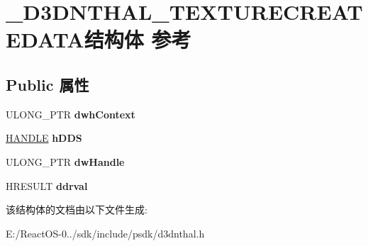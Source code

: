 \hypertarget{struct___d3_d_n_t_h_a_l___t_e_x_t_u_r_e_c_r_e_a_t_e_d_a_t_a}{}\section{\+\_\+\+D3\+D\+N\+T\+H\+A\+L\+\_\+\+T\+E\+X\+T\+U\+R\+E\+C\+R\+E\+A\+T\+E\+D\+A\+T\+A结构体 参考}
\label{struct___d3_d_n_t_h_a_l___t_e_x_t_u_r_e_c_r_e_a_t_e_d_a_t_a}
\subsection*{Public 属性}
\begin{DoxyCompactItemize}
\item 
\mbox{\label{struct___d3_d_n_t_h_a_l___t_e_x_t_u_r_e_c_r_e_a_t_e_d_a_t_a_a893158416548fc50cd1261cc3a8f753e}} 
U\+L\+O\+N\+G\+\_\+\+P\+TR {\bfseries dwh\+Context}
\item 
\mbox{\label{struct___d3_d_n_t_h_a_l___t_e_x_t_u_r_e_c_r_e_a_t_e_d_a_t_a_ae858645075b39c3b681d6f4f59da5d8f}} 
\hyperlink{interfacevoid}{H\+A\+N\+D\+LE} {\bfseries h\+D\+DS}
\item 
\mbox{\label{struct___d3_d_n_t_h_a_l___t_e_x_t_u_r_e_c_r_e_a_t_e_d_a_t_a_aaefb6058cec7806db0766e6041b7c273}} 
U\+L\+O\+N\+G\+\_\+\+P\+TR {\bfseries dw\+Handle}
\item 
\mbox{\label{struct___d3_d_n_t_h_a_l___t_e_x_t_u_r_e_c_r_e_a_t_e_d_a_t_a_adcaf8a49e1e89456f5a5be62149b85f0}} 
H\+R\+E\+S\+U\+LT {\bfseries ddrval}
\end{DoxyCompactItemize}


该结构体的文档由以下文件生成\+:\begin{DoxyCompactItemize}
\item 
E\+:/\+React\+O\+S-\/0../sdk/include/psdk/d3dnthal.\+h\end{DoxyCompactItemize}
